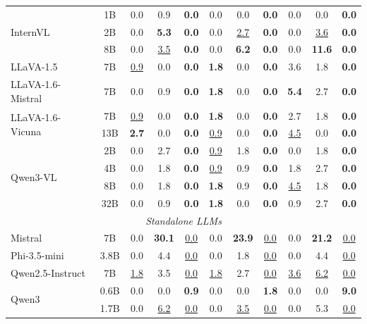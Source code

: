 \begin{table}[t]
{\begin{tabular}{lc|ccc|ccc|ccc}
\midrule
\multirow{3}{*}{InternVL} & 1B & 0.0 & 0.9 & \textbf{0.0} & 0.0 & 0.0 & \textbf{0.0} & 0.0 & 0.0 & \textbf{0.0} \\
 & 2B & 0.0 & \textbf{5.3} & \textbf{0.0} & 0.0 & \underline{2.7} & \textbf{0.0} & 0.0 & \underline{3.6} & \textbf{0.0} \\
 & 8B & 0.0 & \underline{3.5} & \textbf{0.0} & 0.0 & \textbf{6.2} & \textbf{0.0} & 0.0 & \textbf{11.6} & \textbf{0.0} \\
LLaVA-1.5 & 7B & \underline{0.9} & 0.0 & \textbf{0.0} & \textbf{1.8} & 0.0 & \textbf{0.0} & 3.6 & 1.8 & \textbf{0.0} \\
LLaVA-1.6-Mistral & 7B & 0.0 & 0.9 & \textbf{0.0} & \textbf{1.8} & 0.0 & \textbf{0.0} & \textbf{5.4} & 2.7 & \textbf{0.0} \\
\multirow{2}{*}{LLaVA-1.6-Vicuna} & 7B & \underline{0.9} & 0.0 & \textbf{0.0} & \textbf{1.8} & 0.0 & \textbf{0.0} & 2.7 & 1.8 & \textbf{0.0} \\
 & 13B & \textbf{2.7} & 0.0 & \textbf{0.0} & \underline{0.9} & 0.0 & \textbf{0.0} & \underline{4.5} & 0.0 & \textbf{0.0} \\
\multirow{4}{*}{Qwen3-VL} & 2B & 0.0 & 2.7 & \textbf{0.0} & \underline{0.9} & 1.8 & \textbf{0.0} & 0.0 & 1.8 & \textbf{0.0} \\
 & 4B & 0.0 & 1.8 & \textbf{0.0} & \underline{0.9} & 0.9 & \textbf{0.0} & 1.8 & 2.7 & \textbf{0.0} \\
 & 8B & 0.0 & 1.8 & \textbf{0.0} & \textbf{1.8} & 0.9 & \textbf{0.0} & \underline{4.5} & 1.8 & \textbf{0.0} \\
 & 32B & 0.0 & 0.9 & \textbf{0.0} & \textbf{1.8} & 0.0 & \textbf{0.0} & 0.9 & 2.7 & \textbf{0.0} \\
\midrule
\multicolumn{11}{c}{\textit{Standalone LLMs}} \\
\midrule
Mistral & 7B & 0.0 & \textbf{30.1} & \underline{0.0} & 0.0 & \textbf{23.9} & \underline{0.0} & 0.0 & \textbf{21.2} & \underline{0.0} \\
Phi-3.5-mini & 3.8B & 0.0 & 4.4 & \underline{0.0} & 0.0 & 1.8 & \underline{0.0} & 0.0 & 4.4 & \underline{0.0} \\
Qwen2.5-Instruct & 7B & \underline{1.8} & 3.5 & \underline{0.0} & \underline{1.8} & 2.7 & \underline{0.0} & \underline{3.6} & \underline{6.2} & \underline{0.0} \\
\multirow{5}{*}{Qwen3} & 0.6B & 0.0 & 0.0 & \textbf{0.9} & 0.0 & 0.0 & \textbf{1.8} & 0.0 & 0.0 & \textbf{9.0} \\
 & 1.7B & 0.0 & \underline{6.2} & \underline{0.0} & 0.0 & \underline{3.5} & \underline{0.0} & 0.0 & 5.3 & \underline{0.0} \\

\end{tabular}}
\end{table}
